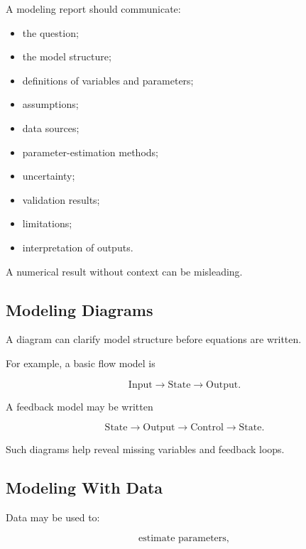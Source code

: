 A modeling report should communicate:

\begin{itemize}
    \item the question;
    \item the model structure;
    \item definitions of variables and parameters;
    \item assumptions;
    \item data sources;
    \item parameter-estimation methods;
    \item uncertainty;
    \item validation results;
    \item limitations;
    \item interpretation of outputs.
\end{itemize}

A numerical result without context can be misleading.

\subsection{Modeling Diagrams}
\label{subsec:modeling-diagrams}

A diagram can clarify model structure before equations are written.

For example, a basic flow model is

\[
\boxed{
\text{Input}
\longrightarrow
\text{State}
\longrightarrow
\text{Output}.
}
\]

A feedback model may be written

\[
\boxed{
\text{State}
\longrightarrow
\text{Output}
\longrightarrow
\text{Control}
\longrightarrow
\text{State}.
}
\]

Such diagrams help reveal missing variables and feedback loops.

\subsection{Modeling With Data}
\label{subsec:modeling-with-data}

Data may be used to:

\[
\boxed{
\text{estimate parameters},
}
\]

